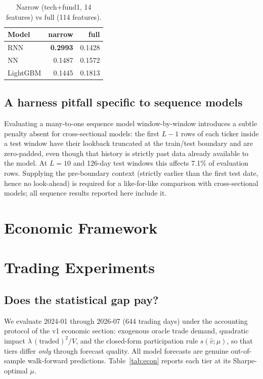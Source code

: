 \documentclass[11pt]{article}
\begin{document}
\begin{table}[h]\centering
\caption{Narrow (tech+fund1, 14 features) vs full (114 features).}
\label{tab:narrow}
\begin{tabular}{lrr}
\toprule
Model & narrow & full \\
\midrule
RNN      & \textbf{0.2993} & 0.1428 \\
NN       & 0.1487 & 0.1572 \\
LightGBM & 0.1445 & 0.1813 \\
\bottomrule
\end{tabular}
\end{table}

\subsection{A harness pitfall specific to sequence models}
Evaluating a many-to-one sequence model window-by-window introduces a subtle
penalty absent for cross-sectional models: the first $L-1$ rows of each ticker
inside a test window have their lookback truncated at the train/test boundary
and are zero-padded, even though that history is strictly past data already
available to the model. At $L=10$ and 126-day test windows this affects 7.1\% of
evaluation rows. Supplying the pre-boundary context (strictly earlier than the
first test date, hence no look-ahead) is required for a like-for-like comparison
with cross-sectional models; all sequence results reported here include it.

\section{Economic Framework}         %

\section{Trading Experiments}        %

\subsection{Does the statistical gap pay?}
We evaluate 2024-01 through 2026-07 (644 trading days) under the accounting
protocol of the v1 economic section: exogenous oracle trade demand, quadratic
impact $\lambda\,(\text{traded})^2/V$, and the closed-form participation rule
$s(\hat v;\mu)$, so that tiers differ \emph{only} through forecast quality. All
model forecasts are genuine out-of-sample walk-forward predictions.
Table~\ref{tab:econ} reports each tier at its Sharpe-optimal $\mu$.
\end{document}
